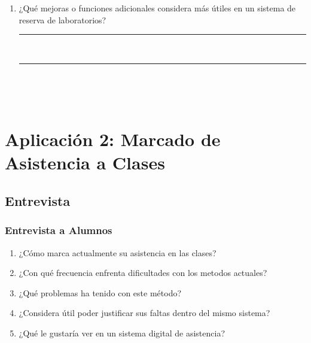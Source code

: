 \documentclass[12pt, a4paper]{article}
\begin{document}
\begin{enumerate}[label=\textbf{P\arabic*}.]
                                                            \item ¿Qué mejoras o funciones adicionales considera más útiles en un sistema de reserva de laboratorios?  \\
                                                                \rule{\textwidth}{0.3pt} \\[0.5cm]
                                                                \rule{\textwidth}{0.3pt} \\[0.5cm]

                                                                \end{enumerate}
                                                                \\

                                                                \section{Aplicación 2: Marcado de Asistencia a Clases}

                                                                \subsection{Entrevista}
                                                                \subsubsection*{Entrevista a Alumnos}
                                                                \begin{enumerate}
                                                                \item ¿Cómo marca actualmente su asistencia en las clases?
                                                                \item ¿Con qué frecuencia enfrenta dificultades con los metodos actuales?
                                                                \item ¿Qué problemas ha tenido con este método?
                                                                \item ¿Considera útil poder justificar sus faltas dentro del mismo sistema?
                                                                \item ¿Qué le gustaría ver en un sistema digital de asistencia?

                                                                \end{enumerate}
\end{document}
